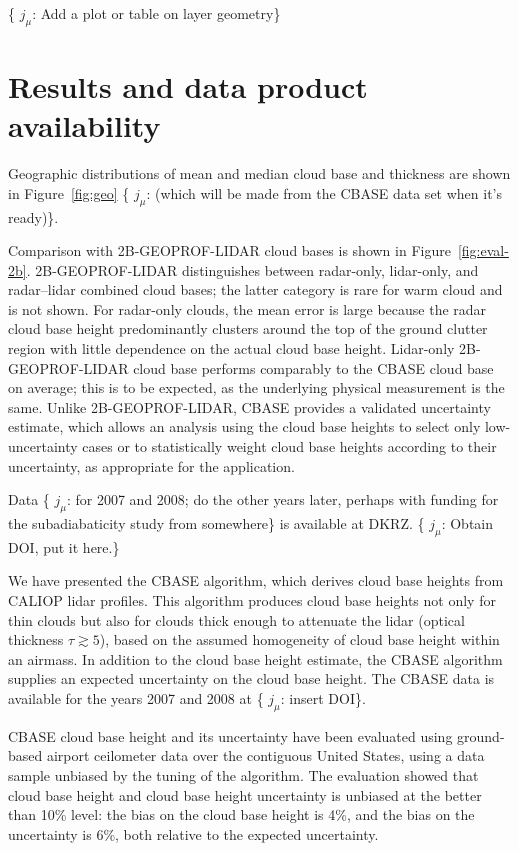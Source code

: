 \documentclass[amt,manuscript]{copernicus}\usepackage[]{graphicx}\usepackage[]{color}
\newcommand{\hlnum}[1]{\textcolor[rgb]{0.686,0.059,0.569}{#1}}%
\newcommand\comment[2]{\{\hlnum{ \textit{#1}: #2}\}}
\newcommand\commentjm[1]{\comment{$j_\mu$}{#1}}
\begin{document}
\commentjm{Add a plot or table on layer geometry}

\section{Results and data product availability}
\label{sec:results}

Geographic distributions of mean and median cloud base and thickness are shown
in Figure~\ref{fig:geo} \commentjm{(which will be made from the CBASE data set
  when it's ready)}.

Comparison with 2B-GEOPROF-LIDAR cloud bases is shown in
Figure~\ref{fig:eval-2b}.   2B-GEOPROF-LIDAR distinguishes between radar-only,
lidar-only, and radar--lidar combined cloud bases; the latter category is rare
for warm cloud and is not shown.  For radar-only clouds, the mean error is large
because the radar cloud base height predominantly clusters around the top of the
ground clutter region with little dependence on the actual cloud base height.
Lidar-only 2B-GEOPROF-LIDAR cloud base performs comparably to the CBASE cloud
base on average; this is to be expected, as the underlying physical measurement
is the same.   Unlike 2B-GEOPROF-LIDAR, CBASE provides a validated uncertainty
estimate, which allows an analysis using the cloud base heights to select only
low-uncertainty cases or to statistically weight cloud base heights according to
their uncertainty, as appropriate for the application.

Data \commentjm{for 2007 and 2008; do the other years later, perhaps with
  funding for the subadiabaticity study from somewhere} is available at DKRZ.
\commentjm{Obtain DOI, put it here.}

\conclusions
\label{sec:conclusions}

We have presented the CBASE algorithm, which derives cloud base heights from
CALIOP lidar profiles.  This algorithm produces cloud base heights not only for
thin clouds but also for clouds thick enough to attenuate the lidar (optical
thickness $\tau \gtrsim 5$), based on the assumed homogeneity of cloud base
height within an airmass.  In addition to the cloud base height estimate, the
CBASE algorithm supplies an expected uncertainty on the cloud base height.
The CBASE data is available for the years 2007 and 2008 at \commentjm{insert DOI}.

CBASE cloud base height and its uncertainty have been evaluated using
ground-based airport ceilometer data over the contiguous United States, using a
data sample unbiased by the tuning of the algorithm.  The evaluation showed that
cloud base height and cloud base height uncertainty is unbiased at the better
than 10\% level: the bias on the cloud base height is %
4\%,
and the bias on the uncertainty is %
6\%, both relative to the expected uncertainty.
\end{document}
